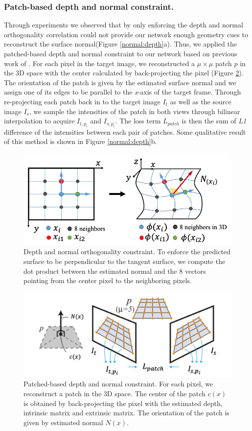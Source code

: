 \documentclass[10pt,twocolumn,letterpaper]{article}
\begin{document}
\subsubsection{Patch-based depth and normal constraint.} 
Through experiments we observed that by only enforcing the depth and normal orthogonality correlation could not provide our network enough geometry cues to reconstruct the surface normal(Figure \ref{normal:depth}a). Thus, we applied the patched-based depth and normal constraint to our network based on previous work of \cite{furukawa2010accurate}. For each pixel in the target image, we reconstructed a $\mu \times \mu$ patch $p$ in the 3D space with the center calculated by back-projecting the pixel (Figure  \ref{fig:patch}). The orientation of the patch is given by the estimated surface normal and we assign one of its edges to be parallel to the \textit{x}-axis of the target frame. Through re-projecting each patch back in to the target image $I_t$ as well as the source image $I_s$, we sample the intensities of the patch in both views through bilinear interpolation to acquire $I_{t,p_i}$ and $I_{s,p_i}$. The loss term $L_{patch}$ is then the sum of \textit{L1} difference of the intensities between each pair of patches. Some qualitative result of this method is shown in Figure \ref{normal:depth}b.
\begin{figure}
  \includegraphics[width=\columnwidth ]{8point.png}
  \caption{Depth and normal orthogonality constraint. To enforce the predicted surface to be perpendicular to the tangent surface, we compute the dot product between the estimated normal and the 8 vectors pointing from the center pixel to the neighboring pixels.}
  \label{fig:8point}
\end{figure}
\begin{figure}
  \includegraphics[width=\columnwidth ]{patch.png}
  \caption{Patched-based depth and normal constraint. For each pixel, we reconstruct a patch in the 3D space. The center of the patch $c(x)$ is obtained by back-projecting the pixel with the estimated depth, intrinsic matrix and extrinsic matrix. The orientation of the patch is given by estimated normal $N(x)$.}
  \label{fig:patch}
\end{figure}
\end{document}
